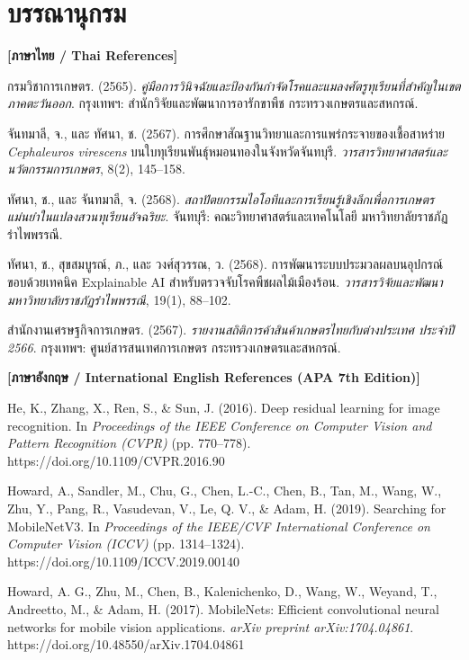 \chapter*{บรรณานุกรม}


\noindent
\begingroup
\setlength{\parindent}{-1.25cm}
\setlength{\leftskip}{1.25cm}
\setlength{\parskip}{8pt}

\textbf{[ภาษาไทย / Thai References]}

กรมวิชาการเกษตร. (2565). \textit{คู่มือการวินิจฉัยและป้องกันกำจัดโรคและแมลงศัตรูทุเรียนที่สำคัญในเขตภาคตะวันออก}. กรุงเทพฯ: สำนักวิจัยและพัฒนาการอารักขาพืช กระทรวงเกษตรและสหกรณ์.

จันทมาลี, จ., และ ทัศนา, ช. (2567). การศึกษาสัณฐานวิทยาและการแพร่กระจายของเชื้อสาหร่าย \textit{Cephaleuros virescens} บนใบทุเรียนพันธุ์หมอนทองในจังหวัดจันทบุรี. \textit{วารสารวิทยาศาสตร์และนวัตกรรมการเกษตร}, 8(2), 145--158.

ทัศนา, ช., และ จันทมาลี, จ. (2568). \textit{สถาปัตยกรรมไอโอทีและการเรียนรู้เชิงลึกเพื่อการเกษตรแม่นยำในแปลงสวนทุเรียนอัจฉริยะ}. จันทบุรี: คณะวิทยาศาสตร์และเทคโนโลยี มหาวิทยาลัยราชภัฏรำไพพรรณี.

ทัศนา, ช., สุขสมบูรณ์, ภ., และ วงศ์สุวรรณ, ว. (2568). การพัฒนาระบบประมวลผลบนอุปกรณ์ขอบด้วยเทคนิค Explainable AI สำหรับตรวจจับโรคพืชผลไม้เมืองร้อน. \textit{วารสารวิจัยและพัฒนา มหาวิทยาลัยราชภัฏรำไพพรรณี}, 19(1), 88--102.

สำนักงานเศรษฐกิจการเกษตร. (2567). \textit{รายงานสถิติการค้าสินค้าเกษตรไทยกับต่างประเทศ ประจำปี 2566}. กรุงเทพฯ: ศูนย์สารสนเทศการเกษตร กระทรวงเกษตรและสหกรณ์.

\vspace{12pt}
\textbf{[ภาษาอังกฤษ / International English References (APA 7th Edition)]}

He, K., Zhang, X., Ren, S., \& Sun, J. (2016). Deep residual learning for image recognition. In \textit{Proceedings of the IEEE Conference on Computer Vision and Pattern Recognition (CVPR)} (pp. 770--778). https://doi.org/10.1109/CVPR.2016.90

Howard, A., Sandler, M., Chu, G., Chen, L.-C., Chen, B., Tan, M., Wang, W., Zhu, Y., Pang, R., Vasudevan, V., Le, Q. V., \& Adam, H. (2019). Searching for MobileNetV3. In \textit{Proceedings of the IEEE/CVF International Conference on Computer Vision (ICCV)} (pp. 1314--1324). https://doi.org/10.1109/ICCV.2019.00140

Howard, A. G., Zhu, M., Chen, B., Kalenichenko, D., Wang, W., Weyand, T., Andreetto, M., \& Adam, H. (2017). MobileNets: Efficient convolutional neural networks for mobile vision applications. \textit{arXiv preprint arXiv:1704.04861}. https://doi.org/10.48550/arXiv.1704.04861


